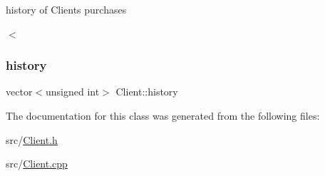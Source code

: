 history of Clients purchases 

$<$ \mbox{\label{classClient_afceda4b2e1aa4cf7cb52478d5e679bad}} 
\subsubsection{\texorpdfstring{history}{history}}
{\footnotesize\ttfamily vector$<$unsigned int$>$ Client\+::history\hspace{0.3cm}{\ttfamily [private]}}



The documentation for this class was generated from the following files\+:\begin{DoxyCompactItemize}
\item 
src/\hyperlink{Client_8h}{Client.\+h}\item 
src/\hyperlink{Client_8cpp}{Client.\+cpp}\end{DoxyCompactItemize}

